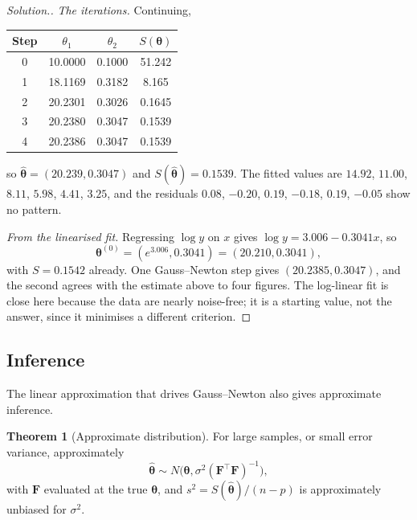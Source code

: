\documentclass[11pt,a4paper]{article}
\numberwithin{equation}{section}
\theoremstyle{definition}
\newtheorem{thm}{Theorem}[subsection]
\newenvironment{solution}
  {\renewcommand{\qedsymbol}{}\begin{proof}[\textit{Solution}.]}
  {\end{proof}}
\begin{document}
\begin{solution}
\emph{The iterations.} Continuing,
\begin{center}
\begin{tabular}{cccc}
Step & $\theta_1$ & $\theta_2$ & $S(\boldsymbol\theta)$ \\
\hline
0 & 10.0000 & 0.1000 & 51.242 \\
1 & 18.1169 & 0.3182 & 8.165 \\
2 & 20.2301 & 0.3026 & 0.1645 \\
3 & 20.2380 & 0.3047 & 0.1539 \\
4 & 20.2386 & 0.3047 & 0.1539 \\
\end{tabular}
\end{center}
so $\hat{\boldsymbol\theta} = (20.239, 0.3047)$ and $S(\hat{\boldsymbol\theta}) = 0.1539$. The fitted values are $14.92$, $11.00$, $8.11$, $5.98$, $4.41$, $3.25$, and the
residuals $0.08$, $-0.20$, $0.19$, $-0.18$, $0.19$, $-0.05$ show no pattern.

\emph{From the linearised fit.} Regressing $\log y$ on $x$ gives $\log y = 3.006 - 0.3041x$, so
\[
\boldsymbol\theta^{(0)} = (e^{3.006}, 0.3041) = (20.210, 0.3041) ,
\]
with $S = 0.1542$ already. One Gauss--Newton step gives $(20.2385, 0.3047)$, and the second agrees with the estimate
above to four figures. The log-linear fit is close here because the data are nearly noise-free; it is a starting
value, not the answer, since it minimises a different criterion.
\end{solution}

\subsection{Inference}
The linear approximation that drives Gauss--Newton also gives approximate inference.

\begin{thm}[Approximate distribution]\label{thm:nl-inference}
For large samples, or small error variance, approximately
\[
\hat{\boldsymbol\theta} \sim N\bigl(\boldsymbol\theta, \sigma^2(\mathbf{F}^\top\mathbf{F})^{-1}\bigr) ,
\]
with $\mathbf{F}$ evaluated at the true $\boldsymbol\theta$, and $s^2 = S(\hat{\boldsymbol\theta})/(n - p)$ is approximately unbiased for $\sigma^2$.
\end{thm}
\end{document}
